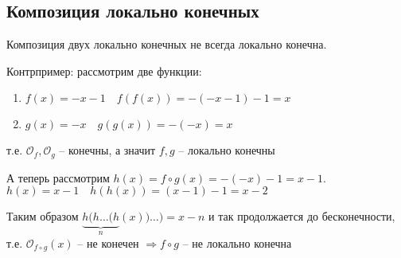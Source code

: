 \documentclass[12pt,a4paper, flushleft]{article}
\begin{document}
\subsection{Композиция локально конечных}
Композиция двух локально конечных не всегда локально конечна.

Контрпример: рассмотрим две функции:
\begin{enumerate}
	\item $f(x) = -x-1\quad f(f(x)) = -(-x-1)-1 = x$
	\item $g(x) = -x\quad g(g(x)) = -(-x) = x$
\end{enumerate}
т.е. $\mathcal{O}_f,  \mathcal{O}_g$ -- конечны, а значит $f, g$ -- локально конечны

А теперь рассмотрим $h(x) = f\circ g(x) = -(-x)-1 = x-1$. $h(x) = x-1\quad h(h(x)) = (x-1)-1 = x-2$

Таким образом $\underbrace{h(h\dots(h}_{n}(x))\dots) = x-n$ и так продолжается до бесконечности, т.е. $\mathcal{O}_{f\circ g}(x)$ -- не конечен $\Rightarrow f\circ g$ -- не локально конечна
\end{document}
